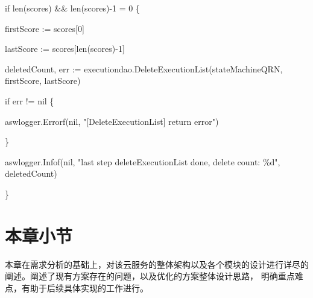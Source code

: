 \begin{algorithm}[h]
    \SetAlgoLined

    if len(scores)  \&\& len(scores)-1 \>= 0 \{

    firstScore := scores[0]

    lastScore := scores[len(scores)-1]

    deletedCount, err := executiondao.DeleteExecutionList(stateMachineQRN, firstScore, lastScore)

    if err != nil \{

    aswlogger.Errorf(nil, "[DeleteExecutionList] return error")

    \}

    aswlogger.Infof(nil, "last step deleteExecutionList done, delete count: \%d", deletedCount)

    \}
\end{algorithm}

\section{本章小节}
本章在需求分析的基础上，对该云服务的整体架构以及各个模块的设计进行详尽的阐述。阐述了现有方案存在的问题，以及优化的方案整体设计思路，
明确重点难点，有助于后续具体实现的工作进行。